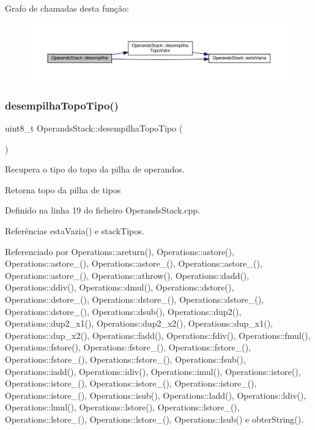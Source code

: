Grafo de chamadas desta função\+:
\nopagebreak
\begin{figure}[H]
\begin{center}
\leavevmode
\includegraphics[width=350pt]{classOperandsStack_a3213a1b633149de9332217d403ee84b6_cgraph}
\end{center}
\end{figure}
\mbox{\label{classOperandsStack_a8c76f12ad6984b3c5b4ec8807eb63ae3}} 
\subsubsection{\texorpdfstring{desempilha\+Topo\+Tipo()}{desempilhaTopoTipo()}}
{\footnotesize\ttfamily uint8\+\_\+t Operands\+Stack\+::desempilha\+Topo\+Tipo (\begin{DoxyParamCaption}{ }\end{DoxyParamCaption})}



Recupera o tipo do topo da pilha de operandos. 

Retorna topo da pilha de tipos 

Definido na linha 19 do ficheiro Operands\+Stack.\+cpp.



Referências esta\+Vazia() e stack\+Tipos.



Referenciado por Operations\+::areturn(), Operations\+::astore(), Operations\+::astore\+\_(), Operations\+::astore\+\_(), Operations\+::astore\+\_(), Operations\+::astore\+\_(), Operations\+::athrow(), Operations\+::dadd(), Operations\+::ddiv(), Operations\+::dmul(), Operations\+::dstore(), Operations\+::dstore\+\_(), Operations\+::dstore\+\_(), Operations\+::dstore\+\_(), Operations\+::dstore\+\_(), Operations\+::dsub(), Operations\+::dup2(), Operations\+::dup2\+\_\+x1(), Operations\+::dup2\+\_\+x2(), Operations\+::dup\+\_\+x1(), Operations\+::dup\+\_\+x2(), Operations\+::fadd(), Operations\+::fdiv(), Operations\+::fmul(), Operations\+::fstore(), Operations\+::fstore\+\_(), Operations\+::fstore\+\_(), Operations\+::fstore\+\_(), Operations\+::fstore\+\_(), Operations\+::fsub(), Operations\+::iadd(), Operations\+::idiv(), Operations\+::imul(), Operations\+::istore(), Operations\+::istore\+\_(), Operations\+::istore\+\_(), Operations\+::istore\+\_(), Operations\+::istore\+\_(), Operations\+::isub(), Operations\+::ladd(), Operations\+::ldiv(), Operations\+::lmul(), Operations\+::lstore(), Operations\+::lstore\+\_(), Operations\+::lstore\+\_(), Operations\+::lstore\+\_(), Operations\+::lsub() e obter\+String().

